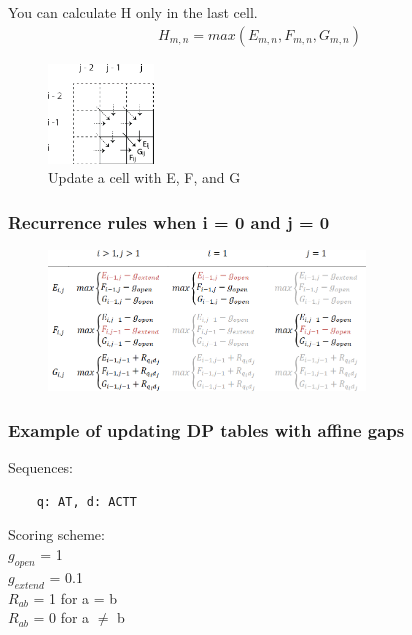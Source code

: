 \noindent You can calculate H only in the last cell.
\begin{align*}
H_{m,n} = max(E_{m,n}, F_{m,n}, G_{m,n})
\end{align*}

\begin{figure}[H]
  \centering
      \includegraphics[width=0.25\textwidth]{fig03/three_dp_tables_update_for_affine.png}
  \caption{Update a cell with E, F, and G}
\end{figure}

%
%

%
%
\subsubsection*{Recurrence rules when i = 0 and j = 0}
\begin{figure}[H]
  \centering
      \includegraphics[width=0.75\textwidth]{fig03/affine_dp_special_cases.png}
\end{figure}
\null \medskip 

%
%
\subsubsection*{Example of updating DP tables with affine gaps}
\begin{multicols}{2}
Sequences:
\begin{verbatim}
    q: AT, d: ACTT
\end{verbatim}
\vfill\null
\columnbreak

\noindent
Scoring scheme: \\
\null \quad $g_{open}$ = 1 \\
\null \quad $g_{extend}$ = 0.1 \\
\null \quad $R_{ab}$ = 1 for a = b \\ 
\null \quad $R_{ab}$ = 0 for a $\neq$ b \\ 

\end{multicols} 
 

